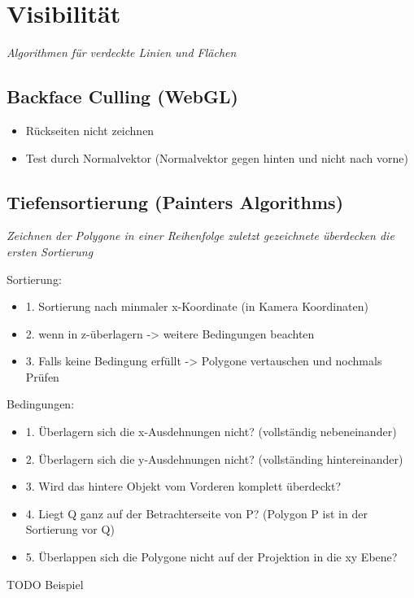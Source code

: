 \section{Visibilität}

\textit{Algorithmen für verdeckte Linien und Flächen}

\subsection{Backface Culling (WebGL)}

\begin{itemize}
	\item Rückseiten nicht zeichnen
	\item Test durch Normalvektor (Normalvektor gegen hinten und nicht nach vorne)
\end{itemize}

\subsection{Tiefensortierung (Painters Algorithms)}

\textit{Zeichnen der Polygone in einer Reihenfolge zuletzt gezeichnete überdecken die ersten Sortierung}
 
Sortierung:
\begin{itemize}
	\item 1. Sortierung nach minmaler x-Koordinate (in Kamera Koordinaten)
	\item 2. wenn in z-überlagern -> weitere Bedingungen beachten
	\item 3. Falls keine Bedingung erfüllt -> Polygone vertauschen und nochmals Prüfen
\end{itemize}

Bedingungen:
\begin{itemize}
	\item 1. Überlagern sich die x-Ausdehnungen nicht? (vollständig nebeneinander)
	\item 2. Überlagern sich die y-Ausdehnungen nicht? (vollständing hintereinander)
	\item 3. Wird das hintere Objekt vom Vorderen komplett überdeckt?
	\item 4. Liegt Q ganz auf der Betrachterseite von P? (Polygon P ist in der Sortierung vor Q)
	\item 5. Überlappen sich die Polygone nicht auf der Projektion in die xy Ebene?
\end{itemize}

TODO Beispiel

